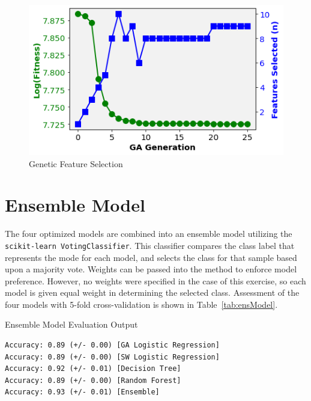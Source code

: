 \documentclass[12pt]{article}
\begin{document}
\begin{figure}
	\begin{center}
	\includegraphics[width=\textwidth, keepaspectratio, angle=0]{featureSelect.png}
	\caption{Genetic Feature Selection}
	\label{fig:featureSelect}
	\end{center}
\end{figure}



\section{Ensemble Model}
The four optimized models are combined into an ensemble model utilizing the \texttt{scikit-learn VotingClassifier}. This classifier compares the class label that represents the mode for each model, and selects the class for that sample based upon a majority vote. Weights can be passed into the method to enforce model preference. However, no weights were specified in the case of this exercise, so each model is given equal weight in determining the selected class. Assessment of the four models with 5-fold cross-validation is shown in Table~\ref{tab:ensModel}.

\begin{center}
\begin{table}[H]
\caption{Ensemble Model Evaluation Output}
\begin{verbatim}
Accuracy: 0.89 (+/- 0.00) [GA Logistic Regression]
Accuracy: 0.89 (+/- 0.00) [SW Logistic Regression]
Accuracy: 0.92 (+/- 0.01) [Decision Tree]
Accuracy: 0.89 (+/- 0.00) [Random Forest]
Accuracy: 0.93 (+/- 0.01) [Ensemble]
\end{verbatim}
\label{tab:ensModel}
\end{table}
\end{center}
\end{document}
